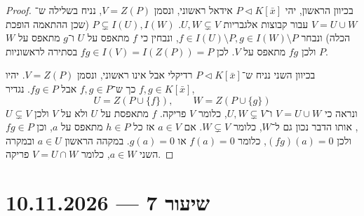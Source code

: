 \begin{proof}
	בכיוון הראשון, יהי $P \triangleleft K[\bar{x}]$ אידאל ראשוני, ונסמן $V = Z(P)$, נניח בשלילה ש־$V = U \cup W$ עבור קבוצות אלגבריות $U, W \subsetneq V$.
	$P \subsetneq I(U), I(W)$ (שכן ההתאמה הופכת הכלה) ונבחר $f \in I(U) \setminus P, g \in I(W) \setminus P$, ונבחין כי $f$ מתאפס על $U$ ו־$g$ מתאפס על $W$ ולכן $f g$ מתאפס על $V$.
	לכן $f g \in I(V) = I(Z(P)) = P$ בסתירה לראשוניות $P$.

	בכיוון השני נניח ש־$P \triangleleft K[\bar{x}]$ רדיקלי אבל אינו ראשוני, ונסמן $V = Z(P)$.
	יהיו $f, g \in K[\bar{x}]$ כך ש־$f, g \in P$ אבל $f g \in P$.
	נגדיר,
	\[
		U = Z(P \cup \{ f \}),
		\qquad
		W = Z(P \cup \{ g \})
	\]
	ונראה כי $V = U \cup W$ ו־$U, W \subsetneq V$, כלומר $V$ פריקה.
	$f$ מתאפסת על $U$ ולא על $V$ ולכן $U \subsetneq V$, אותו הדבר נכון גם ל־$W$, כלומר $W \subsetneq V$.
	אם $a \in V$ אז כל $h \in P$ מתאפס על $a$, וכן $f g \in P$ ולכן $(f g)(a) = 0$, כלומר $f(a) = 0$ או $g(a) = 0$.
	במקהה הראשון $a \in U$ ובמקרה השני $a \in W$, כלומר $V = U \cap W$ פריקה.
\end{proof}

\section{שיעור 7 --- 10.11.2026}

